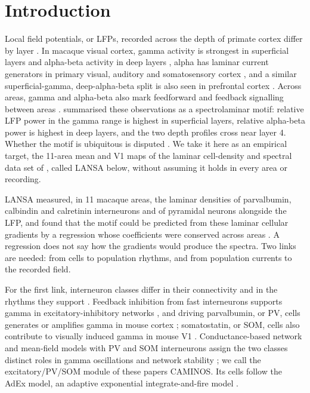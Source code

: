 \section{Introduction}

Local field potentials, or LFPs, recorded across the depth of primate cortex differ by layer
\citep{Maier2010,Xing2012}. In macaque visual cortex, gamma activity is strongest in superficial layers and
alpha-beta activity in deep layers \citep{Buffalo2011,vanKerkoerle2014}, alpha has laminar current generators in
primary visual, auditory and somatosensory cortex \citep{Haegens2015}, and a similar superficial-gamma, deep-alpha-beta split is also seen in prefrontal
cortex \citep{Bastos2020}. Across areas, gamma and alpha-beta also mark feedforward and feedback signalling between
areas \citep{vanKerkoerle2014,Bastos2015}. \citet{MendozaHalliday2024} summarised these observations as a
spectrolaminar motif: relative LFP power in the gamma range is highest in superficial layers, relative alpha-beta
power is highest in deep layers, and the two depth profiles cross near layer 4. Whether the motif is ubiquitous is
disputed \citep{Mackey2026}. We take it here as an empirical target, the 11-area mean and V1 maps of the laminar
cell-density and spectral data set of \citet{Mulvey2024}, called LANSA below, without assuming it holds in every area or
recording.

LANSA measured, in 11 macaque areas, the laminar densities of parvalbumin, calbindin and calretinin interneurons
and of pyramidal neurons alongside the LFP, and found that the motif could be predicted from these laminar cellular
gradients by a regression whose coefficients were conserved across areas \citep{Mulvey2024}. A regression does not
say how the gradients would produce the spectra. Two links are needed: from cells to population rhythms, and from
population currents to the recorded field.

For the first link, interneuron classes differ in their connectivity and in the rhythms they support
\citep{Tremblay2016}. Feedback inhibition from fast interneurons supports gamma in excitatory-inhibitory networks
\citep{Borgers2003}, and driving parvalbumin, or PV, cells generates or amplifies gamma in mouse cortex
\citep{Cardin2009,Sohal2009}; somatostatin, or SOM, cells also contribute to visually induced gamma in mouse V1
\citep{Veit2017}. Conductance-based network and mean-field models with PV and SOM interneurons assign the two
classes distinct roles in gamma oscillations and network stability \citep{Tahvili2025,Tahvili2026}; we call the
excitatory/PV/SOM module of these papers CAMINOS. Its cells follow the AdEx model, an adaptive exponential integrate-and-fire
model \citep{Brette2005}.

